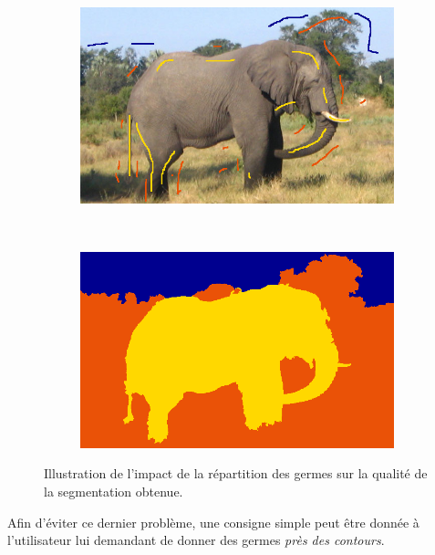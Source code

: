 \begin{emodif}
\begin{figure}[htb]
\begin{subfigure}{0.4\textwidth}
 \end{subfigure}
 \\~\\
 \begin{subfigure}{0.4\textwidth}	
\includegraphics[width=\textwidth]{images/evaluation/fails/germes_02}
 \end{subfigure}
 ~
 \begin{subfigure}{0.4\textwidth}	
\includegraphics[width=\textwidth]{images/evaluation/fails/seg_02}
 \end{subfigure}
\caption{Illustration de l'impact de la répartition des germes  sur la qualité de la segmentation obtenue.}
	\label{fig:eval:Algo-fails}
\end{figure} 

Afin d'éviter ce dernier problème, une consigne simple peut être donnée à l'utilisateur lui demandant de donner des germes \og \textit{près des contours}\fg. 

\end{emodif}

